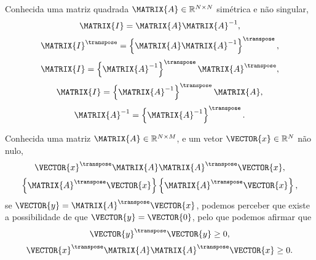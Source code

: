 \begin{myproofT}\label{proof:theo:simetricmatrix4}
Conhecida uma matriz quadrada $\MATRIX{A} \in \mathbb{R}^{N \times N}$ simétrica e não singular, 
\begin{equation}
\MATRIX{I}=\MATRIX{A}\MATRIX{A}^{-1},
\end{equation}
\begin{equation}
\MATRIX{I}^{\transpose}=\left\{\MATRIX{A}\MATRIX{A}^{-1}\right\}^{\transpose},
\end{equation}
\begin{equation}
\MATRIX{I}=\left\{\MATRIX{A}^{-1}\right\}^{\transpose} \MATRIX{A}^{\transpose},
\end{equation}
\begin{equation}
\MATRIX{I}=\left\{\MATRIX{A}^{-1}\right\}^{\transpose} \MATRIX{A},
\end{equation}
\begin{equation}
\MATRIX{A}^{-1}=\left\{\MATRIX{A}^{-1}\right\}^{\transpose}.
\end{equation}
\end{myproofT}


\begin{myproofT}\label{proof:theo:semipositivematrix1}
Conhecida uma matriz $\MATRIX{A} \in \mathbb{R}^{N \times M}$,
e um vetor $\VECTOR{x} \in \mathbb{R}^{N}$ não nulo,
\begin{equation}
\VECTOR{x}^{\transpose}\MATRIX{A}\MATRIX{A}^{\transpose}\VECTOR{x},
\end{equation}
\begin{equation}
\left\{\MATRIX{A}^{\transpose}\VECTOR{x}\right\}\left\{\MATRIX{A}^{\transpose}\VECTOR{x}\right\},
\end{equation}
se $\VECTOR{y}=\MATRIX{A}^{\transpose}\VECTOR{x}$, 
podemos perceber que existe a possibilidade de que $\VECTOR{y}=\VECTOR{0}$,
pelo que podemos afirmar que 
\begin{equation}
\VECTOR{y}^{\transpose}\VECTOR{y}\geq 0,
\end{equation}
\begin{equation}
\VECTOR{x}^{\transpose}\MATRIX{A}\MATRIX{A}^{\transpose}\VECTOR{x}\geq 0.
\end{equation}
\end{myproofT}

